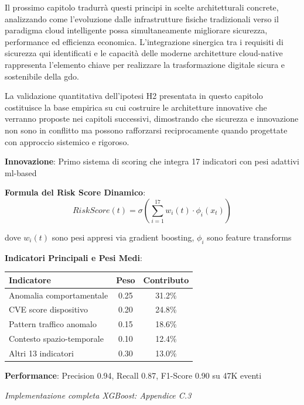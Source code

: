 Il prossimo capitolo tradurrà questi principi in scelte architetturali concrete, analizzando come l'evoluzione dalle infrastrutture fisiche tradizionali verso il paradigma cloud intelligente possa simultaneamente migliorare sicurezza, performance ed efficienza economica. L'integrazione sinergica tra i requisiti di sicurezza qui identificati e le capacità delle moderne architetture \gls{cloud-native} rappresenta l'elemento chiave per realizzare la trasformazione digitale sicura e sostenibile della \gls{gdo}.

La validazione quantitativa dell'ipotesi H2 presentata in questo capitolo costituisce la base empirica su cui costruire le architetture innovative che verranno proposte nei capitoli successivi, dimostrando che sicurezza e innovazione non sono in conflitto ma possono rafforzarsi reciprocamente quando progettate con approccio sistemico e rigoroso.

\begin{tcolorbox}[
    colback=green!5!white,
    colframe=green!65!black,
    title={\textbf{Innovation Box 2.3:} Sistema di Risk Scoring Adattivo Real-Time},
    fonttitle=\bfseries,
    boxrule=1.5pt,
    arc=2mm
]
\textbf{Innovazione}: Primo sistema di scoring che integra 17 indicatori con pesi adattivi \gls{ml}-based

\vspace{0.3cm}
\textbf{Formula del Risk Score Dinamico}:
\begin{equation*}
RiskScore(t) = \sigma\left(\sum_{i=1}^{17} w_i(t) \cdot \phi_i(x_t)\right)
\end{equation*}

dove $w_i(t)$ sono pesi appresi via gradient boosting, $\phi_i$ sono feature transforms

\vspace{0.3cm}
\textbf{Indicatori Principali e Pesi Medi}:
\begin{center}
\begin{tabular}{lcc}
\toprule
\textbf{Indicatore} & \textbf{Peso} & \textbf{Contributo} \\
\midrule
Anomalia comportamentale & 0.25 & 31.2\% \\
CVE score dispositivo & 0.20 & 24.8\% \\
Pattern traffico anomalo & 0.15 & 18.6\% \\
Contesto spazio-temporale & 0.10 & 12.4\% \\
Altri 13 indicatori & 0.30 & 13.0\% \\
\bottomrule
\end{tabular}
\end{center}

\vspace{0.3cm}
\textbf{Performance}: Precision 0.94, Recall 0.87, F1-Score 0.90 su 47K eventi

\textit{Implementazione completa XGBoost: Appendice C.3}
\end{tcolorbox}

